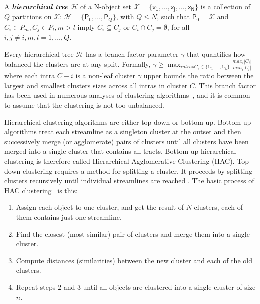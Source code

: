 \begin{definition}
\label{def:hierarchical_tree}
A \textit{\textbf{hierarchical tree}} $\mathcal{H}$ of a N-object set $\mathcal{X}=\{\mathsf{x_1}, \ldots, \mathsf{x_j}, \ldots, \mathsf{x_N}\}$ is a collection of $Q$ partitions on $\mathcal{X}$: $\mathcal{H}=\{\mathsf{P}_0,\ldots,\mathsf{P}_Q\}$, with $Q \leq N$, such that $\mathsf{P}_0=\mathcal{X}$ and $C_{i} \in P_{m}, C_{j} \in P_{l}, m > l$ imply $C_{i} \subseteq C_{j}$ or $C_{i} \cap C_{j} = \emptyset$, for all $i,j \neq i, m, l = 1, \ldots, Q$.
\end{definition}
Every hierarchical tree $\mathcal{H}$ has a branch factor parameter $\gamma$ that quantifies how balanced the clusters are at any split.
Formally, $\gamma \geq \max_{intras C_i \in \{C_1, \ldots,C_k\}} \frac{max_i |C_i|}{min_i |C_i|}$
 where each intra $C-i$ is a non-leaf cluster
 $\gamma$ upper bounds the ratio between the largest and smallest clusters sizes across all intras in cluster $C$. This branch factor has been used in numerous analyses of clustering algorithms~\cite{eriksson2011active,balakrishnan2011noise}, and it is common to assume that the clustering is not too unbalanced.

Hierarchical clustering algorithms are either top down or bottom up. Bottom-up algorithms treat each streamline as a singleton cluster at the outset and then successively merge (or agglomerate) pairs of clusters until all clusters have been merged into a single cluster that contains all tracts. Bottom-up hierarchical clustering is therefore called Hierarchical Agglomerative Clustering (HAC). Top-down clustering requires a method for splitting a cluster. It proceeds by splitting clusters recursively until individual streamlines are reached \cite{johnson1967hierarchical}.
The basic process of HAC clustering~\cite{johnson1967hierarchical} is this:
\begin{enumerate}
	\item Assign each object to one cluster, and get the result of $N$ clusters, each of them contains just one streamline.
	\item Find the closest (most similar) pair of clusters and merge them into a single cluster.
	\item Compute distances (similarities) between the new cluster and each of the old clusters.
	\item Repeat steps $2$ and $3$ until all objects are clustered into a single cluster of size $n$.
\end{enumerate}

